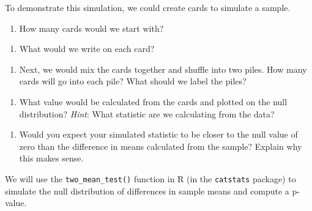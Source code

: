 \documentclass[
]{report}
\providecommand{\tightlist}{%
  \setlength{\itemsep}{0pt}\setlength{\parskip}{0pt}}
\begin{document}
To demonstrate this simulation, we could create cards to simulate a sample.

\begin{enumerate}
\def\labelenumi{\arabic{enumi}.}
\setcounter{enumi}{9}
\tightlist
\item
  How many cards would we start with?
\end{enumerate}

\vspace{0.3in}

\begin{enumerate}
\def\labelenumi{\arabic{enumi}.}
\setcounter{enumi}{10}
\tightlist
\item
  What would we write on each card?
\end{enumerate}

\vspace{0.3in}

\begin{enumerate}
\def\labelenumi{\arabic{enumi}.}
\setcounter{enumi}{11}
\tightlist
\item
  Next, we would mix the cards together and shuffle into two piles. How many cards will go into each pile? What should we label the piles?
\end{enumerate}

\vspace{.8in}

\begin{enumerate}
\def\labelenumi{\arabic{enumi}.}
\setcounter{enumi}{12}
\tightlist
\item
  What value would be calculated from the cards and plotted on the null distribution? \emph{Hint}: What statistic are we calculating from the data?
\end{enumerate}

\vspace{0.3in}

\begin{enumerate}
\def\labelenumi{\arabic{enumi}.}
\setcounter{enumi}{13}
\tightlist
\item
  Would you expect your simulated statistic to be closer to the null value of zero than the difference in means calculated from the sample? Explain why this makes sense.
\end{enumerate}

\vspace{0.8in}

We will use the \texttt{two\_mean\_test()} function in R (in the \texttt{catstats} package) to simulate the null distribution of differences in sample means and compute a p-value.
\end{document}

